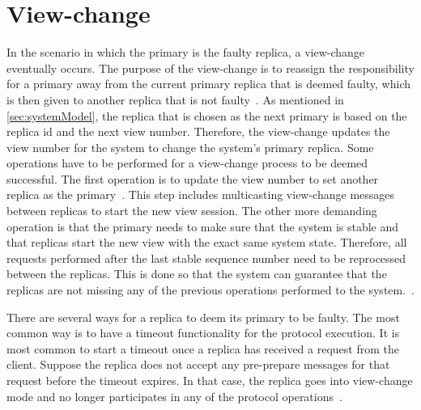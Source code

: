 \section{View-change}
\label{sec:view-change}
In the scenario in which the primary is the faulty replica, a view-change eventually occurs. The purpose of the view-change is to reassign the responsibility for a primary away from the current primary replica that is deemed faulty, which is then given to another replica that is not faulty~\cites[p.262]{BOOK:BuildDepDistSyst}. As mentioned in \autoref{sec:systemModel}, the replica that is chosen as the next primary is based on the replica id and the next view number. Therefore, the view-change updates the view number for the system to change the system’s primary replica. Some operations have to be performed for a view-change process to be deemed successful. The first operation is to update the view number to set another replica as the primary~\cites[p.~6]{PAPER:OGPBFT}[p.~411]{PAPER:PBFTRecovery}{WEB:SawtoothPBFT}. This step includes multicasting view-change messages between replicas to start the new view session. The other more demanding operation is that the primary needs to make sure that the system is stable and that replicas start the new view with the exact same system state. Therefore, all requests performed after the last stable sequence number need to be reprocessed between the replicas. This is done so that the system can guarantee that the replicas are not missing any of the previous operations performed to the system.~\cites[p.~458]{BOOK:MVstandver3}[p.~263-265]{BOOK:BuildDepDistSyst}.

There are several ways for a replica to deem its primary to be faulty. The most common way is to have a timeout functionality for the protocol execution. It is most common to start a timeout once a replica has received a request from the client. Suppose the replica does not accept any pre-prepare messages for that request before the timeout expires. In that case, the replica goes into view-change mode and no longer participates in any of the protocol operations~\cites{SLIDES:PBFT}[p.~5-6]{PAPER:OGPBFT}[p.~263]{BOOK:BuildDepDistSyst}.  

